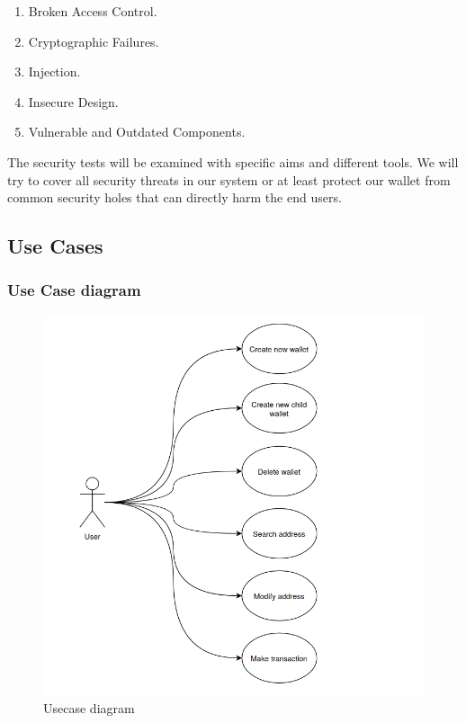 \begin{enumerate}
    \item Broken Access Control.
    \item Cryptographic Failures.
    \item Injection.
    \item Insecure Design.
    \item Vulnerable and Outdated Components.
\end{enumerate}

The security tests will be examined with specific aims and different tools. We will try to cover all security threats in our system or at least protect our wallet from common security holes that can directly harm the end users.


\subsection{Use Cases}

\subsubsection{Use Case diagram}

\begin{figure}[!ht]
    \centering
    \includegraphics[width=1\textwidth]{images/usecases.png}
    \caption[Usecase diagram]{Usecase diagram}
    \label{fig:usecases}
\end{figure}

